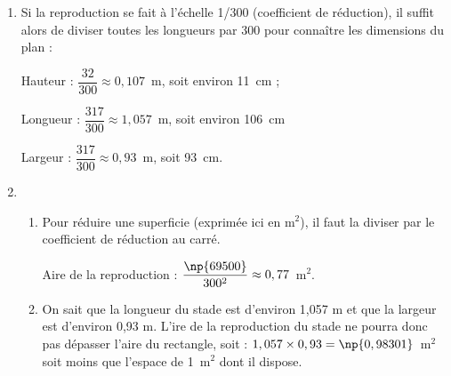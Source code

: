 
\medskip

\begin{enumerate}
\item Si la reproduction se fait à l'échelle 1/300 (coefficient de réduction), il suffit alors de diviser toutes les longueurs par 300 pour connaître les dimensions du plan :

Hauteur : $\dfrac{32}{300}\approx  0,107$~m, soit environ 11~cm ;

Longueur : $\dfrac{317}{300}\approx 1,057$~m, soit environ 106~cm

Largeur : $\dfrac{317}{300}\approx 0,93$~m, soit 93~cm.
\item  
	\begin{enumerate}
		\item Pour réduire une superficie (exprimée ici en m$^2$), il faut la diviser par le coefficient de réduction au carré.
		
Aire de la reproduction  : $\dfrac{\np{69500}}{300^2} \approx  0,77$~m$^2$.
		\item On sait que la longueur du stade est d'environ 1,057 m et que la largeur est d'environ 0,93 m. L'ire de la reproduction du stade ne pourra donc pas dépasser l'aire du rectangle, soit : $1,057 \times  0,93 = \np{0,98301}$~m$^2$ soit moins 
que l'espace de 1~m$^2$ dont il dispose.
	\end{enumerate}
\end{enumerate}

\vspace{0,25cm}

